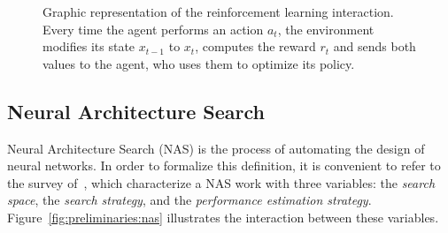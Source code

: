 \begin{figure}[ht]
\begin{center}
\caption{Graphic representation of the reinforcement learning interaction. Every time the agent performs an action $a_t$, the environment modifies its state $x_{t-1}$ to $x_t$, computes the reward $r_t$ and sends both values to the agent, who uses them to optimize its policy.}
\label{fig:preliminaries:rl}
\end{center}
\end{figure}

\subsection{Neural Architecture Search}\label{sec:preliminaries:nas}

Neural Architecture Search (NAS) is the process of automating the design of neural networks. In order to formalize this definition, it is convenient to refer to the survey of~\citet{NASsurvey}, which characterize a NAS work with three variables: the \textit{search space}, the \textit{search strategy}, and the \textit{performance estimation strategy}. Figure~\ref{fig:preliminaries:nas} illustrates the interaction between these variables.

